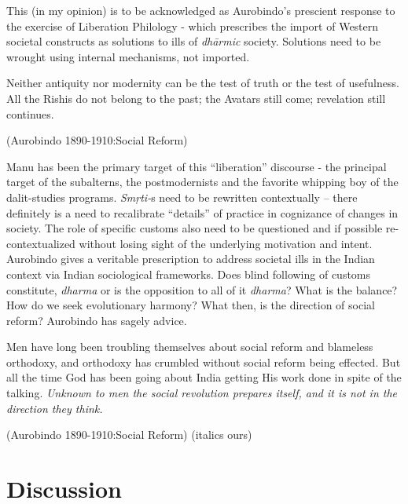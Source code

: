 This (in my opinion) is to be acknowledged as Aurobindo's prescient response to the exercise of Liberation Philology - which prescribes the import of Western societal constructs as solutions to ills of \textit{dhārmic} society. Solutions need to be wrought using internal mechanisms, not imported.

\begin{myquote}
Neither antiquity nor modernity can be the test of truth or the test of usefulness. All the Rishis do not belong to the past; the Avatars still come; revelation still continues.
\end{myquote}

\hfill (Aurobindo 1890-1910:Social Reform)

Manu has been the primary target of this “liberation” discourse - the principal target of the subalterns, the postmodernists and the favorite whipping boy of the dalit-studies programs. \textit{Smṛti-}s need to be rewritten contextually – there definitely is a need to recalibrate “details” of practice in cognizance of changes in society. The role of specific customs also need to be questioned and if possible re-contextualized without losing sight of the underlying motivation and intent. Aurobindo gives a veritable prescription to address societal ills in the Indian context via Indian sociological frameworks. Does blind following of customs constitute, \textit{dharma} or is the opposition to all of it \textit{dharma}? What is the balance? How do we seek evolutionary harmony? What then, is the direction of social reform? Aurobindo has sagely advice.

\begin{myquote}
Men have long been troubling themselves about social reform and blameless orthodoxy, and orthodoxy has crumbled without social reform being effected. But all the time God has been going about India getting His work done in spite of the talking. \textit{Unknown to men the social revolution prepares itself, and it is not in the direction they think.}
\end{myquote}

\hfill (Aurobindo 1890-1910:Social Reform) (italics ours)


\section*{Discussion}

\vskip -7pt

